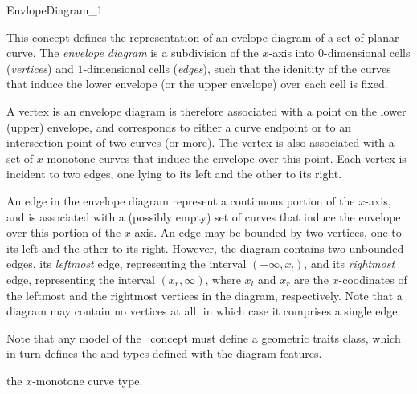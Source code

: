 
\ccRefPageBegin

\begin{ccRefConcept}{EnvlopeDiagram_1}

\ccDefinition

This concept defines the representation of an evelope diagram of a set
of planar curve. The {\em envelope diagram} is a subdivision of the $x$-axis
into $0$-dimensional cells ({\em vertices}) and $1$-dimensional cells
({\em edges}), such that the idenitity of the curves that induce the lower
envelope (or the upper envelope) over each cell is fixed.

A vertex is an envelope diagram is therefore associated with a point
on the lower (upper) envelope, and corresponds to either a curve endpoint
or to an intersection point of two curves (or more). The vertex is also
associated with a set of $x$-monotone curves that induce the envelope
over this point. Each vertex is incident to two edges, one lying to its
left and the other to its right.

An edge in the envelope diagram represent a continuous portion of the
$x$-axis, and is associated with a (possibly empty) set of curves that
induce the envelope over this portion of the $x$-axis. An edge may be bounded
by two vertices, one to its left and the other to its right. However, the
diagram contains two unbounded edges, its {\em leftmost} edge, representing
the interval $(-\infty, x_l)$, and its {\em rightmost} edge, representing the
interval $(x_r, \infty)$, where $x_l$ and $x_r$ are the $x$-coodinates of
the leftmost and the rightmost vertices in the diagram, respectively.
Note that a diagram may contain no vertices at all, in which case it
comprises a single edge.

Note that any model of the \ccRefName\ concept must define a geometric
traits class, which in turn defines the  and 
 types defined with the diagram features.

\ccTypes


\ccGlue
{}
{the $x$-monotone curve type.}


\end{ccRefConcept}
